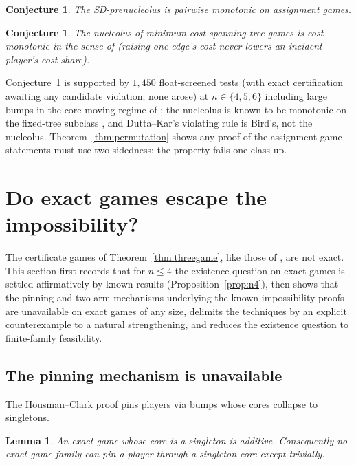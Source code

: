 \documentclass[11pt]{article}
\newtheorem{lemma}[theorem]{Lemma}
\newtheorem{conjecture}[theorem]{Conjecture}
\begin{document}
\begin{conjecture}\label{conj:assign}
The SD-prenucleolus is pairwise monotonic on assignment games.
\end{conjecture}

\begin{conjecture}\label{conj:mcst}
The nucleolus of minimum-cost spanning tree games is cost monotonic in the
sense of \citet{DuttaKar2004} (raising one edge's cost never
lowers an incident player's cost share).
\end{conjecture}

Conjecture~\ref{conj:mcst} is supported by $1{,}450$ float-screened tests
(with exact certification awaiting any candidate violation; none arose) at
$n\in\{4,5,6\}$ including large bumps in the core-moving regime of
\citet{TanCaoZou2025}; the nucleolus is known to be monotonic on the
fixed-tree subclass \citep{MPR2010}, and Dutta--Kar's violating rule is
Bird's, not the nucleolus. Theorem~\ref{thm:permutation} shows any proof of
the assignment-game statements must use two-sidedness: the property fails
one class up.

\section{Do exact games escape the impossibility?}\label{sec:escape}

The certificate games of Theorem~\ref{thm:threegame}, like those of
\citet{HousmanClark98}, are not exact. This section first records that for
$n\le4$ the existence question on exact games is settled affirmatively by
known results (Proposition~\ref{prop:n4}), then shows that the pinning and
two-arm mechanisms underlying the known impossibility proofs are
unavailable on exact games of any size, delimits the techniques by an
explicit counterexample to a natural strengthening, and reduces the
existence question to finite-family feasibility.

\subsection{The pinning mechanism is unavailable}

The Housman--Clark proof pins players via bumps whose cores collapse to
singletons.

\begin{lemma}\label{lem:singleton}
An exact game whose core is a singleton is additive. Consequently no exact
game family can pin a player through a singleton core except trivially.
\end{lemma}
\end{document}
